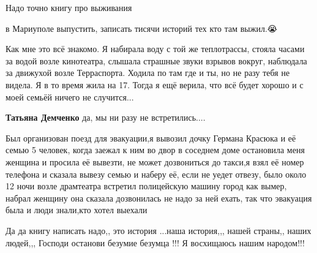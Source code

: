  
 
 
 
 

\qqSecCmt


Надо точно книгу про выживания

в Мариуполе выпустить, записать тисячи историй тех кто там выжил.😭


Как мне это всё знакомо. Я набирала воду с той же теплотрассы, стояла часами за
водой возле кинотеатра, слышала страшные звуки взрывов вокруг, наблюдала за
движухой возле Терраспорта. Ходила по там где и ты, но не разу тебя не видела.
Я в то время жила на 17. Тогда я ещё верила, что всё будет хорошо и с моей
семьёй ничего не случится...

\begin{itemize} %
\textbf{Татьяна Демченко} да, мы ни разу не встретились....
\end{itemize} %


Был организован поезд для эвакуации,я вывозил дочку Германа Красюка и её семью
5 человек, когда заежал к ним во двор в соседнем доме остановила меня женщина и
просила её вывезти, не может дозвониться до такси,я взял её номер телефона и
сказала вывезу семью и наберу её, если не уедет отвезу, было около 12 ночи
возле драмтеатра встретил полицейскую машину город как вымер, набрал женщину
она сказала дозвонилась не надо за ней ехать, так что эвакуация была и люди
знали,кто хотел выехали


Да да книгу написать надо,, это история ...наша история,,, нашей страны,, наших
людей,,, Господи останови безумие безумца !!! Я восхищаюсь нашим народом!!!
